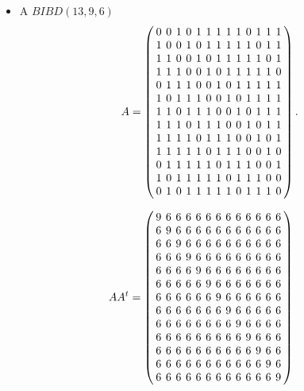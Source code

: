 \documentclass{beamer}
\begin{document}
\begin{frame}

  \begin{itemize}
  \item A $BIBD(13,9,6)$
    \[
      A=
      \arraycolsep=2.0pt\def\arraystretch{1.0}
      \left(
      \begin{array}{ccccccccccccc}
        0&0&1&0&1&1&1&1&1&0&1&1&1\\
        1&0&0&1&0&1&1&1&1&1&0&1&1\\
        1&1&0&0&1&0&1&1&1&1&1&0&1\\
        1&1&1&0&0&1&0&1&1&1&1&1&0\\
        0&1&1&1&0&0&1&0&1&1&1&1&1\\
        1&0&1&1&1&0&0&1&0&1&1&1&1\\
        1&1&0&1&1&1&0&0&1&0&1&1&1\\
        1&1&1&0&1&1&1&0&0&1&0&1&1\\
        1&1&1&1&0&1&1&1&0&0&1&0&1\\
        1&1&1&1&1&0&1&1&1&0&0&1&0\\
        0&1&1&1&1&1&0&1&1&1&0&0&1\\
        1&0&1&1&1&1&1&0&1&1&1&0&0\\
        0&1&0&1&1&1&1&1&0&1&1&1&0\\
      \end{array}
      \right).
    \]
  \end{itemize}
  
\end{frame}

\begin{frame}
  \[
    AA^t =
    \arraycolsep=2.0pt\def\arraystretch{1.0}
    \left(
    \begin{array}{ccccccccccccc}
      9&6&6&6&6&6&6&6&6&6&6&6&6\\
      6&9&6&6&6&6&6&6&6&6&6&6&6\\
      6&6&9&6&6&6&6&6&6&6&6&6&6\\
      6&6&6&9&6&6&6&6&6&6&6&6&6\\
      6&6&6&6&9&6&6&6&6&6&6&6&6\\
      6&6&6&6&6&9&6&6&6&6&6&6&6\\
      6&6&6&6&6&6&9&6&6&6&6&6&6\\
      6&6&6&6&6&6&6&9&6&6&6&6&6\\
      6&6&6&6&6&6&6&6&9&6&6&6&6\\
      6&6&6&6&6&6&6&6&6&9&6&6&6\\
      6&6&6&6&6&6&6&6&6&6&9&6&6\\
      6&6&6&6&6&6&6&6&6&6&6&9&6\\
      6&6&6&6&6&6&6&6&6&6&6&6&9\\
    \end{array}
    \right)
  \]
\end{frame}
\end{document}
